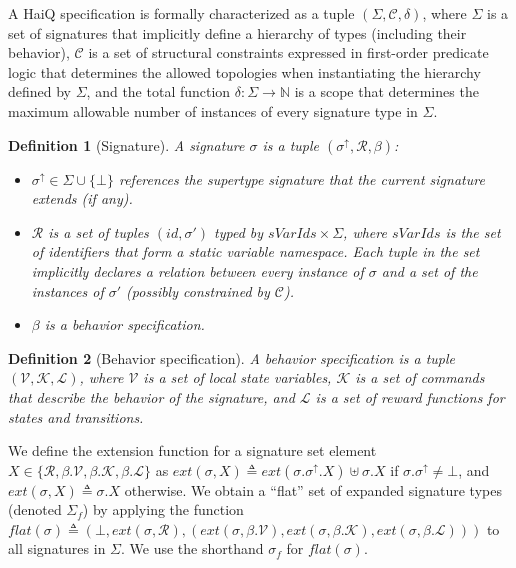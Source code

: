 \documentclass[10pt,journal,compsoc]{IEEEtran}
\newtheorem{definition}{Definition}
\begin{document}
A {\sf HaiQ} specification is formally characterized as a tuple $(\Sigma, \mathcal{C}, \delta)$, where $\Sigma$ is a set of signatures that implicitly define a hierarchy of types (including their behavior), $\mathcal{C}$ is a set of structural constraints expressed in first-order predicate logic that determines the allowed topologies when instantiating the hierarchy defined by $\Sigma$, and the total function $\delta:\Sigma \rightarrow \mathds{N}$ is a scope that determines the maximum allowable number of instances of every signature type in $\Sigma$. 
\begin{definition}[Signature] A signature $\sigma$ is a tuple $(\sigma^{\uparrow},\mathcal{R},\beta)$:
  \begin{itemize}
  	\setlength{\itemsep}{1pt}
	\setlength{\parskip}{0pt}
	\setlength{\parsep}{0pt}
      \item $\sigma^{\uparrow} \in \Sigma \cup \{ \bot \}$ references the supertype signature that the current signature extends (if any).
      \item $\mathcal{R}$ is a set of tuples $(id, \sigma')$ typed by $ sVarIds \times \Sigma$, where $sVarIds$ is the set of identifiers that form a static variable namespace. 
       Each tuple in the set implicitly declares a relation between every instance of $\sigma$ and a set of the instances of $\sigma'$ (possibly constrained by $\mathcal{C}$). 
      \item $\beta$ is a behavior specification. 
      
  \end{itemize}
\end{definition}
\begin{definition}[Behavior specification] A behavior specification is a tuple $(\mathcal{V}, \mathcal{K}, \mathcal{L})$, where $\mathcal{V}$ is a set of local state variables, $\mathcal{K}$ is a set of commands that describe the behavior of the signature, and $\mathcal{L}$ is a set of reward functions for states and transitions.
\end{definition}
We define the extension function for a signature set element $X \in \{\mathcal{R}, \beta.\mathcal{V}, \beta.\mathcal{K}, \beta.\mathcal{L}\}$ as $ext(\sigma, X) \triangleq ext(\sigma.\sigma^{\uparrow}.X) \uplus \sigma.X $ if $\sigma.\sigma^{\uparrow}\neq\bot$, and $ext(\sigma, X)\triangleq\sigma.X$ otherwise. 
We obtain a ``flat'' set of expanded signature types (denoted $\Sigma_f$) by applying the function $flat(\sigma)\triangleq(\bot, ext(\sigma,\mathcal{R}), (ext(\sigma,\beta.\mathcal{V}),ext(\sigma,\beta.\mathcal{K}),ext(\sigma,\beta.\mathcal{L})))$ to all signatures in $\Sigma$. We use the shorthand $\sigma_f$ for $flat(\sigma)$.
\end{document}
